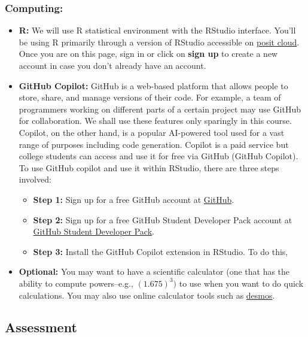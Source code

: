 \documentclass[
  letterpaper,
  DIV=11,
  numbers=noendperiod]{scrartcl}
\begin{document}
\subsubsection{Computing:}\label{computing}

\begin{itemize}
\item
  \textbf{R:} We will use R statistical environment with the RStudio
  interface. You'll be using R primarily through a version of RStudio
  accessible on \href{https://posit.cloud/}{posit cloud}. Once you are
  on this page, sign in or click on \textbf{sign up} to create a new
  account in case you don't already have an account.
\item
  \textbf{GitHub Copilot:} GitHub is a web-based platform that allows
  people to store, share, and manage versions of their code. For
  example, a team of programmers working on different parts of a certain
  project may use GitHub for collaboration. We shall use these features
  only sparingly in this course. Copilot, on the other hand, is a
  popular AI-powered tool used for a vast range of purposes including
  code generation. Copilot is a paid service but college students can
  access and use it for free via GitHub (GitHub Copilot). To use GitHub
  copilot and use it within RStudio, there are three steps involved:

  \begin{itemize}
  \item
    \textbf{Step 1:} Sign up for a free GitHub account at
    \href{https://github.com}{GitHub}.
  \item
    \textbf{Step 2:} Sign up for a free GitHub Student Developer Pack
    account at \href{https://education.github.com/pack}{GitHub Student
    Developer Pack}.
  \item
    \textbf{Step 3:} Install the GitHub Copilot extension in RStudio. To
    do this,
  \end{itemize}
\item
  \textbf{Optional:} You may want to have a scientific calculator (one
  that has the ability to compute powers--e.g., \((1.675)^3)\) to use
  when you want to do quick calculations. You may also use online
  calculator tools such as \href{https://www.desmos.com}{desmos}.
\end{itemize}

\subsection{Assessment}\label{assessment}
\end{document}
